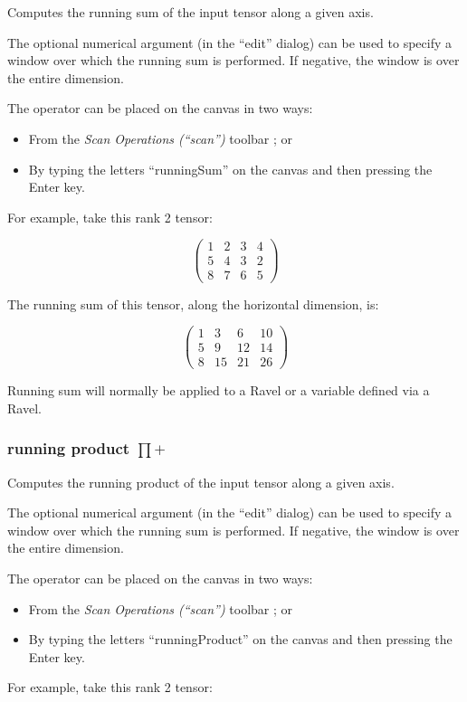 
\label{Operation:runningSum} Computes the running sum of the input
tensor along a given axis.

The optional numerical argument (in the ``edit'' dialog) can be used
to specify a window over which the running sum is performed. If
negative, the window is over the entire dimension.

The operator can be placed on the canvas in two ways:
\begin{itemize}
\item From the \emph{Scan Operations (``scan'') }toolbar ;
or 
\item By typing the letters ``runningSum'' on the canvas and then pressing
the Enter key.
\end{itemize}
For example, take this rank 2 tensor:

\[
\left(\begin{array}{cccc}
1 & 2 & 3 & 4\\
5 & 4 & 3 & 2\\
8 & 7 & 6 & 5
\end{array}\right)
\]

The running sum of this tensor, along the horizontal dimension, is:

\[
\left(\begin{array}{cccc}
1 & 3 & 6 & 10\\
5 & 9 & 12 & 14\\
8 & 15 & 21 & 26
\end{array}\right)
\]

Running sum will normally be applied to a Ravel or a variable defined
via a Ravel.

\subsubsection{running product $\prod+$}


\label{Operation:runningProduct} Computes the running product of
the input tensor along a given axis.

The optional numerical argument (in the ``edit'' dialog) can be used
to specify a window over which the running sum is performed. If
negative, the window is over the entire dimension.

The operator can be placed on the canvas in two ways:
\begin{itemize}
\item From the \emph{Scan Operations (``scan'')} toolbar ;
or 
\item By typing the letters ``runningProduct'' on the canvas and then pressing
the Enter key.
\end{itemize}
For example, take this rank 2 tensor:

